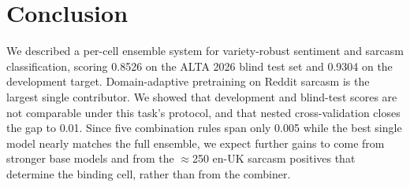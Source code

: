 \documentclass[11pt]{article}
\begin{document}
\section{Conclusion}

We described a per-cell ensemble system for variety-robust sentiment and
sarcasm classification, scoring 0.8526 on the ALTA 2026 blind test set and
0.9304 on the development target. Domain-adaptive pretraining on Reddit
sarcasm is the largest single contributor. We showed that development and
blind-test scores are not comparable under this task's protocol, and that
nested cross-validation closes the gap to 0.01. Since five combination rules
span only 0.005 while the best single model nearly matches the full ensemble,
we expect further gains to come from stronger base models and from the
$\approx$250 en-UK sarcasm positives that determine the binding cell, rather
than from the combiner.

{\small

}
\end{document}
